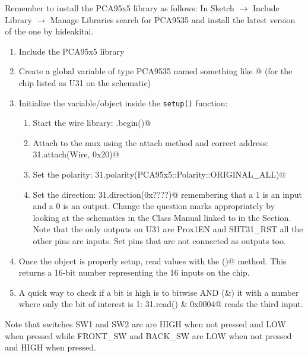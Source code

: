 Remember to install the PCA95x5 library as follows:
In Sketch $\rightarrow$ Include Library $\rightarrow$ Manage Libraries search for 
PCA9535 and install the latest version of the one by hideakitai.

\begin{enumerate}
    \item Include the PCA95x5 library
    \item Create a global variable of type PCA9535 named something like @ 
            (for the chip listed as U31 on the schematic)
    \item Initialize the variable/object inside the \lstinline|setup()| function:
    \begin{enumerate}
        \item Start the wire library: \lstinline@Wire.begin()@
        \item Attach to the mux using the attach method and correct address: 
                \lstinline@muxU31.attach(Wire, 0x20)@
        \item Set the polarity: \lstinline@muxU31.polarity(PCA95x5::Polarity::ORIGINAL_ALL)@ 
        \item Set the direction: \lstinline@muxU31.direction(0x????)@ remembering that a 1 is 
                an input and a 0 is an output. Change the 
                question marks appropriately by looking at the schematics in the Class Manual 
                linked to in the  Section. Note that 
                the only outputs on U31 are Prox1EN and SHT31\_RST all the other pins are 
                inputs. Set pins that are not connected as outputs too.
    \end{enumerate}
    \item Once the object is properly setup, read values with the \lstinline@read()@ 
            method. This returns a 16-bit number representing the 16 inputs on the chip.
    \item A quick way to check if a bit is high is to bitwise AND (\&) it with a number 
            where only the bit of interest is 1: \lstinline@mux31.read() & 0x0004@ reads 
            the third input.
\end{enumerate}

Note that switches SW1 and SW2 are are HIGH when not pressed and LOW 
when pressed while FRONT\_SW and BACK\_SW are LOW when not pressed and HIGH when pressed.

